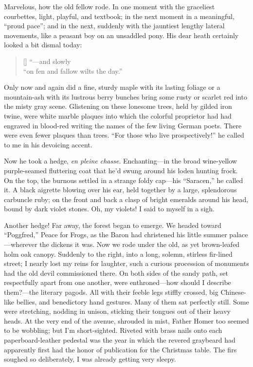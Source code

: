\documentclass[12pt,a4paper]{article}
\begin{document}
Marvelous, how the old fellow rode. In one moment with the graceliest courbettes, light, playful, and textbook; in the next moment in a meaningful, “proud pace”; and in the next, suddenly with the jauntiest lengthy lateral movements, like a peasant boy on an unsaddled pony. His dear heath certainly looked a bit dismal today:
\settowidth{\versewidth}{“on fen and fallow wilts the day”}
\begin{verse}[\versewidth]
“—and slowly \\
“on fen and fallow wilts the day.”
\end{verse}
Only now and again did a fine, sturdy maple with its lasting foliage or a mountain-ash with its lustrous berry bunches bring some rusty or scarlet red into the misty gray scene. Glistening on these lonesome trees, held by gilded iron twine, were white marble plaques into which the colorful proprietor had had engraved in blood-red writing the names of the few living German poets. There were even fewer plaques than trees. “For those who live prospectively!” he called to me in his devoicing accent.

Now he took a hedge, \textit{en pleine chasse}. Enchanting—in the broad wine-yellow purple-seamed fluttering coat that he’d swung around his loden hunting frock. On the top, the burnous settled in a strange foldy cap—his “Saracen,” he called it. A black aigrette blowing over his ear, held together by a large, splendorous carbuncle ruby; on the front and back a clasp of bright emeralds around his head, bound by dark violet stones. Oh, my violets! I said to myself in a sigh.

Another hedge! Far away, the forest began to emerge. We headed toward “Poggfred,” Peace for Frogs, as the Baron had christened his little summer palace—wherever the dickens it was. Now we rode under the old, as yet brown-leafed holm oak canopy. Suddenly to the right, into a long, solemn, stirless fir-lined street; I nearly lost my reins for laughter, such a curious procession of monuments had the old devil commissioned there. On both sides of the sandy path, set respectfully apart from one another, were enthroned—how should I describe them?—the literary pagods. All with their feeble legs stiffly crossed, big Chinese-like bellies, and benedictory hand gestures. Many of them sat perfectly still. Some were stretching, nodding in unison, sticking their tongues out of their heavy heads. At the very end of the avenue, shrouded in mist, Father Homer too seemed to be wobbling; but I’m short-sighted. Riveted with brass nails onto each paperboard-leather pedestal was the year in which the revered graybeard had apparently first had the honor of publication for the Christmas table. The firs soughed so deliberately, I was already getting very sleepy.
\end{document}
